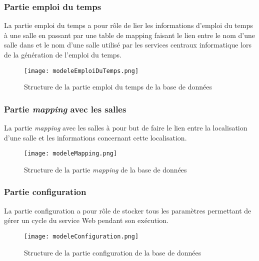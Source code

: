 \begin{appendices}
\subsubsection{Partie emploi du temps}

La partie emploi du temps a pour r\^ole de lier les informations d'emploi du temps \`a une salle en passant par une table de mapping faisant le lien entre le nom d'une salle dans {\YuukouII} et le nom d'une salle utilis\'e par les services centraux informatique lors de la g\'en\'eration de l'emploi du temps.

\clearpage

\begin{figure}[!ht]
	\centering
	\texttt{[image: modeleEmploiDuTemps.png]}
	\caption{Structure de la partie emploi du temps de la base de donn\'ees}
	\label{annexe:modeleEmploiDuTemps}

\end{figure}

\subsubsection{Partie \textit{mapping} avec les salles}

La partie \textit{mapping} avec les salles \`a pour but de faire le lien entre la localisation d'une salle et les informations concernant cette localisation.

\begin{figure}[!ht]
	\centering
	\texttt{[image: modeleMapping.png]}
	\caption{Structure de la partie \textit{mapping} de la base de donn\'ees}
	\label{annexemodeleMapping}

\end{figure}

\subsubsection{Partie configuration}

La partie configuration a pour r\^ole de stocker tous les param\`etres permettant de g\'erer un cycle du service Web pendant son ex\'ecution.

\begin{figure}[!ht]
	\centering
	\texttt{[image: modeleConfiguration.png]}
	\caption{Structure de la partie configuration de la base de donn\'ees}
	\label{annexe:modeleConfiguration}

\end{figure}


\end{appendices}
